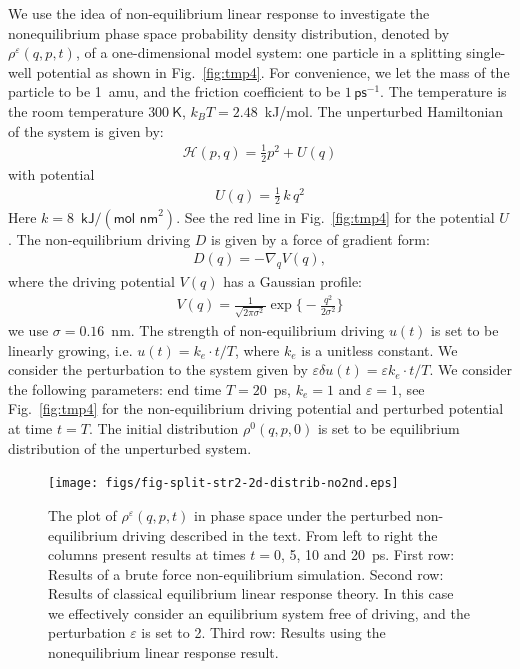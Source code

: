 \documentclass[]{tMPH2e}
\newcommand{\mh}{\mathcal H}
\newcommand{\eps}{\varepsilon}
\begin{document}
We use the idea of non-equilibrium linear response to investigate the
nonequilibrium phase space probability density distribution, denoted by $\rho^\eps(q, p, t)$, of a one-dimensional model system: one particle in a
splitting single-well potential as shown in Fig.~\ref{fig:tmp4}.  For convenience, we let the mass of
the particle to be 1~\textsf{amu}, and the friction coefficient to be
$1\,\textsf{ps}^{-1}$.
The temperature is the
room temperature $300\ \textsf{K}$, $k_BT = 2.48$~\textsf{kJ/mol}.
The unperturbed Hamiltonian of the system is
given by:
\begin{align}
  \mh ( p,  q) = \frac 12  p^2 + U( q) 
\end{align}
with potential
\begin{align}
  U( q) = \frac12\,k\, q^2 
\end{align}
Here $k = 8$~$\textsf{kJ} / (\textsf{mol nm}^2)$.
See the red line in Fig.~\ref{fig:tmp4} for the  potential $U$.
The non-equilibrium driving $ D$ is given by a force of gradient form:
\begin{align}
   D( q) = -\nabla_{ q} V( q) ,
\end{align}
where the driving potential $V( q)$ has a Gaussian profile:
\begin{align}
  V( q) = \frac{1}{\sqrt{2\pi \sigma^2}}
  \exp\Big\{-\frac{ q^2}{2\sigma^2}\Big\}
\end{align}
we use $\sigma = 0.16$~\textsf{nm}.  The strength of non-equilibrium
driving $u(t)$ is set to be linearly growing, i.e. $ u(t) = k_e\cdot t/T$,
where $k_e$ is a unitless constant.
We
consider the perturbation to the system given by $\eps\delta u(t) = \eps k_e \cdot t/T$.
We consider the following parameters: end time $T = 20$~\textsf{ps}, 
$k_e = 1$ and $\eps = 1$, see Fig.~\ref{fig:tmp4}
for the non-equilibrium driving potential and perturbed
potential at time $t = T$. The initial distribution $\rho^0(q, p, 0)$ is set to
be equilibrium distribution of the unperturbed system.

\begin{figure}
  \centering
  \texttt{[image: figs/fig-split-str2-2d-distrib-no2nd.eps]}
  \caption{ The plot of $ \rho^\eps(q,p,t)$ in  phase
    space under the perturbed non-equilibrium driving described in the text. From left to right the columns present results at times $t =
    0$, 5, 10 and 20~\textsf{ps}.  First row: Results of a brute force
    non-equilibrium simulation. Second row: Results of
    classical equilibrium linear response theory. In this case we
    effectively consider an equilibrium system free of driving, and the perturbation $\eps$ is set to 2.  Third row: Results using the
    nonequilibrium linear response result.  }
  \label{fig:tmp6}
\end{figure}
\end{document}
